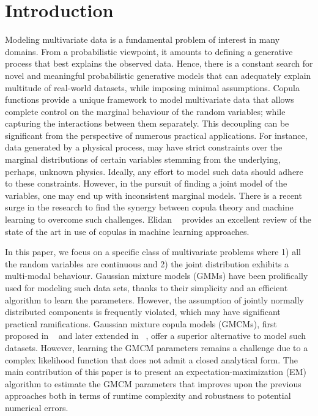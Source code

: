 \documentclass[]{article}
\begin{document}
\section{Introduction}\label{sec:Intro}
Modeling multivariate data is a fundamental problem of interest in many domains. From a probabilistic viewpoint, it amounts to defining a generative process that best explains the observed data. Hence, there is a constant search for novel and  meaningful probabilistic generative models that can adequately explain multitude of real-world datasets, while imposing minimal assumptions. Copula functions provide a unique framework to model multivariate data that allows complete control on the marginal behaviour of the random variables; while capturing the interactions between them separately. This decoupling can be significant from the perspective of numerous practical applications. For instance, data generated by a physical process, may have strict constraints over the marginal distributions of certain variables stemming from the underlying, perhaps, unknown physics. Ideally, any effort to model such data should adhere to these constraints. However, in the pursuit of finding a joint model of the variables, one may end up with inconsistent marginal models. There is a recent surge in the research to find the synergy between copula theory and machine learning to overcome such challenges. Elidan ~\cite{Elidan2013} provides an excellent review of the state of the art in use of copulas in machine learning approaches.

In this paper, we focus on a specific class of multivariate problems where 1) all the random variables are continuous and 2) the joint distribution exhibits a multi-modal behaviour. Gaussian mixture models (GMMs) have been prolifically used for  modeling such data sets, thanks to their simplicity and an efficient algorithm to learn the parameters. However, the assumption of jointly normally distributed components is frequently violated, which may have significant practical ramifications. Gaussian mixture copula models (GMCMs), first proposed in ~\cite{Tewari2011} and later extended in ~\cite{Bilgrau2015, Bhattacharya2014}, offer a superior alternative to model such datasets. However, learning the GMCM parameters remains a challenge due to a complex likelihood function that does not admit a closed analytical form. The main contribution of this paper is to present an expectation-maximization (EM) algorithm to estimate the GMCM parameters that improves upon the previous approaches both in terms of runtime complexity and robustness to potential numerical errors. 
\end{document}
